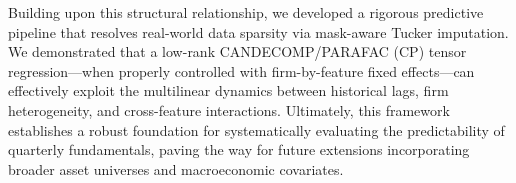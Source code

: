 \documentclass[pdflatex,sn-mathphys-num]{sn-jnl}%
\theoremstyle{thmstyleone}%
\theoremstyle{thmstyletwo}%
\theoremstyle{thmstylethree}%
\begin{document}
Building upon this structural relationship, we developed a rigorous predictive pipeline that resolves real-world data sparsity via mask-aware Tucker imputation. We demonstrated that a low-rank CANDECOMP/PARAFAC (CP) tensor regression---when properly controlled with firm-by-feature fixed effects---can effectively exploit the multilinear dynamics between historical lags, firm heterogeneity, and cross-feature interactions. Ultimately, this framework establishes a robust foundation for systematically evaluating the predictability of quarterly fundamentals, paving the way for future extensions incorporating broader asset universes and macroeconomic covariates.

\end{document}
